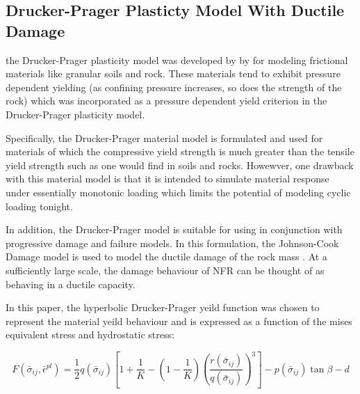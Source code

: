 \subsection{Drucker-Prager Plasticty Model With Ductile Damage}

the Drucker-Prager plasticity model was developed by by \citet{drucker_implications_1950} for modeling frictional materials like granular soils and rock. These materials tend  to exhibit pressure dependent yielding (as confining
pressure increases, so does the strength of the rock) which was incorporated as a pressure dependent yield criterion in the Drucker-Prager plasticity model. 

Specifically, the Drucker-Prager material model is formulated and used for materials of which the compressive yield strength is much greater than the tensile yield strength such as one would find in soils and rocks. Howewver, one drawback with this material model is that it is intended to simulate material response under essentially monotonic loading which limits the potential of modeling cyclic loading tonight.

In addition, the Drucker-Prager model is suitable for using in conjunction with progressive damage and failure models. In this formulation, the Johnson-Cook Damage model is used to model the ductile damage of the rock mass \cite{johnson_fracture_1985}. At a sufficiently large scale, the damage behaviour of NFR can be thought of as behaving in a ductile capacity. 




In this paper, the hyperbolic Drucker-Prager yeild function was chosen to represent the material yeild behaviour and is expressed as a function of the mises equivalent stress and hydrostatic stress:

\begin{equation}
F\left(\bar{\sigma}_{ij}, \bar{\epsilon}^{pl}\right)=\frac{1}{2}q\left(\bar{\sigma}_{ij}\right)\left [ 1+\frac{1}{K}-\left ( 1-\frac{1}{K} \right )\left ( \frac{r\left(\bar{\sigma}_{ij}\right)}{q\left(\bar{\sigma}_{ij}\right)} \right )^3 \right ]-p\left(\bar{\sigma}_{ij}\right)\tan\beta-d\label{eqn:druc2}
\end{equation}

